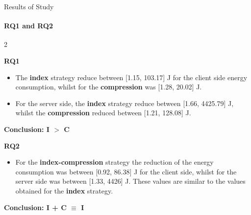 \documentclass{beamer}
\begin{document}
\begin{frame}{Results of Study}

\framesubtitle{RQ1 and RQ2}
\begin{multicols}{2}

\centerline{\textbf{RQ1}}
\begin{itemize}
    \item \small{The \textbf{index} strategy reduce between [1.15, 103.17] J for the client side energy consumption, whilst for the \textbf{compression} was [1.28, 20.02] J.}
    \item \small{ For the server side, the \textbf{index} strategy reduce between [1.66, 4425.79] J, whilst the \textbf{compression} reduced between [1.21, 128.08] J.}
\end{itemize}

\centerline{\textbf{Conclusion: I $>$ C}}

\columnbreak
\centerline{\textbf{RQ2}}

\begin{itemize}
\item \small{ For the \textbf{index-compression} strategy the reduction
of the energy consumption was between [0.92, 86.38] J for the client
side, whilst for the server side was between [1.33, 4426] J. These values are similar to the values obtained for the \textbf{index} strategy.}
\end{itemize}
\centerline{\textbf{Conclusion: I + C $\equiv$ I}}
\end{multicols}

\end{frame}
\end{document}
